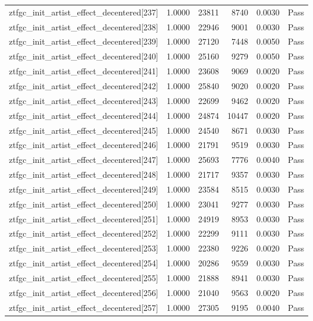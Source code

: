 \begin{table}[htbp]
\begin{tabular}{llrrll}
ztfgc\_init\_artist\_effect\_decentered[237] & 1.0000 & 23811 & 8740 & 0.0030 & Pass \\
ztfgc\_init\_artist\_effect\_decentered[238] & 1.0000 & 22946 & 9001 & 0.0030 & Pass \\
ztfgc\_init\_artist\_effect\_decentered[239] & 1.0000 & 27120 & 7448 & 0.0050 & Pass \\
ztfgc\_init\_artist\_effect\_decentered[240] & 1.0000 & 25160 & 9279 & 0.0050 & Pass \\
ztfgc\_init\_artist\_effect\_decentered[241] & 1.0000 & 23608 & 9069 & 0.0020 & Pass \\
ztfgc\_init\_artist\_effect\_decentered[242] & 1.0000 & 25840 & 9020 & 0.0020 & Pass \\
ztfgc\_init\_artist\_effect\_decentered[243] & 1.0000 & 22699 & 9462 & 0.0020 & Pass \\
ztfgc\_init\_artist\_effect\_decentered[244] & 1.0000 & 24874 & 10447 & 0.0020 & Pass \\
ztfgc\_init\_artist\_effect\_decentered[245] & 1.0000 & 24540 & 8671 & 0.0030 & Pass \\
ztfgc\_init\_artist\_effect\_decentered[246] & 1.0000 & 21791 & 9519 & 0.0030 & Pass \\
ztfgc\_init\_artist\_effect\_decentered[247] & 1.0000 & 25693 & 7776 & 0.0040 & Pass \\
ztfgc\_init\_artist\_effect\_decentered[248] & 1.0000 & 21717 & 9357 & 0.0030 & Pass \\
ztfgc\_init\_artist\_effect\_decentered[249] & 1.0000 & 23584 & 8515 & 0.0030 & Pass \\
ztfgc\_init\_artist\_effect\_decentered[250] & 1.0000 & 23041 & 9277 & 0.0030 & Pass \\
ztfgc\_init\_artist\_effect\_decentered[251] & 1.0000 & 24919 & 8953 & 0.0030 & Pass \\
ztfgc\_init\_artist\_effect\_decentered[252] & 1.0000 & 22299 & 9111 & 0.0030 & Pass \\
ztfgc\_init\_artist\_effect\_decentered[253] & 1.0000 & 22380 & 9226 & 0.0020 & Pass \\
ztfgc\_init\_artist\_effect\_decentered[254] & 1.0000 & 20286 & 9559 & 0.0030 & Pass \\
ztfgc\_init\_artist\_effect\_decentered[255] & 1.0000 & 21888 & 8941 & 0.0030 & Pass \\
ztfgc\_init\_artist\_effect\_decentered[256] & 1.0000 & 21040 & 9563 & 0.0020 & Pass \\
ztfgc\_init\_artist\_effect\_decentered[257] & 1.0000 & 27305 & 9195 & 0.0040 & Pass \\

\end{tabular}
\end{table}

